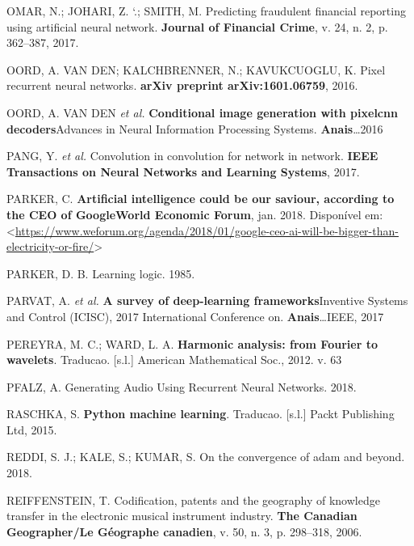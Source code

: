 \documentclass[]{article}
\begin{document}
\leavevmode\hypertarget{ref-omar2017predicting}{}%
OMAR, N.; JOHARI, Z. `.; SMITH, M. Predicting fraudulent financial
reporting using artificial neural network. \textbf{Journal of Financial
Crime}, v. 24, n. 2, p. 362--387, 2017.

\leavevmode\hypertarget{ref-oord2016pixel}{}%
OORD, A. VAN DEN; KALCHBRENNER, N.; KAVUKCUOGLU, K. Pixel recurrent
neural networks. \textbf{arXiv preprint arXiv:1601.06759}, 2016.

\leavevmode\hypertarget{ref-van2016conditional}{}%
OORD, A. VAN DEN \emph{et al.} \textbf{Conditional image generation with
pixelcnn decoders}Advances in Neural Information Processing Systems.
\textbf{Anais}\ldots{}2016

\leavevmode\hypertarget{ref-pang2017convolution}{}%
PANG, Y. \emph{et al.} Convolution in convolution for network in
network. \textbf{IEEE Transactions on Neural Networks and Learning
Systems}, 2017.

\leavevmode\hypertarget{ref-parker_2018}{}%
PARKER, C. \textbf{Artificial intelligence could be our saviour,
according to the CEO of Google}\textbf{World Economic Forum}, jan. 2018.
Disponível em:
\textless{}\url{https://www.weforum.org/agenda/2018/01/google-ceo-ai-will-be-bigger-than-electricity-or-fire/}\textgreater{}

\leavevmode\hypertarget{ref-parker1985learning}{}%
PARKER, D. B. Learning logic. 1985.

\leavevmode\hypertarget{ref-parvat2017survey}{}%
PARVAT, A. \emph{et al.} \textbf{A survey of deep-learning
frameworks}Inventive Systems and Control (ICISC), 2017 International
Conference on. \textbf{Anais}\ldots{}IEEE, 2017

\leavevmode\hypertarget{ref-pereyra2012harmonic}{}%
PEREYRA, M. C.; WARD, L. A. \textbf{Harmonic analysis: from Fourier to
wavelets}. Traducao. {[}s.l.{]} American Mathematical Soc., 2012. v. 63

\leavevmode\hypertarget{ref-pfalz2018generating}{}%
PFALZ, A. Generating Audio Using Recurrent Neural Networks. 2018.

\leavevmode\hypertarget{ref-raschka2015python}{}%
RASCHKA, S. \textbf{Python machine learning}. Traducao. {[}s.l.{]} Packt
Publishing Ltd, 2015.

\leavevmode\hypertarget{ref-reddi2018convergence}{}%
REDDI, S. J.; KALE, S.; KUMAR, S. On the convergence of adam and beyond.
2018.

\leavevmode\hypertarget{ref-reiffenstein2006codification}{}%
REIFFENSTEIN, T. Codification, patents and the geography of knowledge
transfer in the electronic musical instrument industry. \textbf{The
Canadian Geographer/Le Géographe canadien}, v. 50, n. 3, p. 298--318,
2006.
\end{document}
